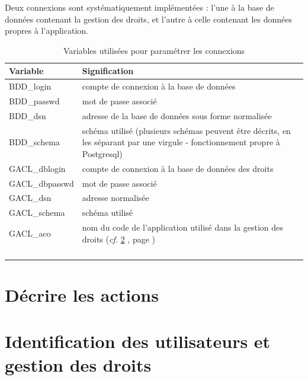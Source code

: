 Deux connexions sont systématiquement implémentées : l'une à la base de données contenant la gestion des droits, et l'autre à celle contenant les données propres à l'application.
\begin{longtable}{|p{5cm}|p{8cm}|}
\hline
\textbf{Variable} & \textbf{Signification} \\
\hline
\endhead
BDD\_login & compte de connexion à la base de données \\
\hline
BDD\_passwd & mot de passe associé\\
\hline
BDD\_dsn & adresse de la base de données sous forme normalisée\\
\hline
BDD\_schema & schéma utilisé (plusieurs schémas peuvent être décrits, en les séparant par une virgule - fonctionnement propre à Postgresql)\\
\hline
GACL\_dblogin & compte de connexion à la base de données des droits\\
\hline
GACL\_dbpasswd & mot de passe associé\\
\hline
GACL\_dsn & adresse normalisée \\
\hline
GACL\_schema & schéma utilisé\\
\hline
GACL\_aco & nom du code de l'application utilisé dans la gestion des droits (\textit{cf.} \ref{droits} \textit{\nameref{droits}}, page \pageref{droits} )\\
\hline
 & \\
\hline
 & \\
\hline
 & \\
\hline

\caption{Variables utilisées pour paramétrer les connexions}
\end{longtable}


\chapter{Décrire les actions}

\chapter{Identification des utilisateurs et gestion des droits}\label{droits}
